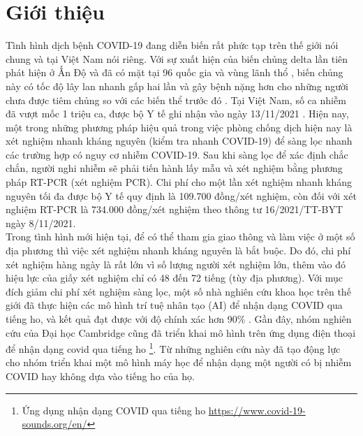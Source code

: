 \documentclass[a4paper, 12pt]{article}
\begin{document}
\fancyfoot{} %
\fancyfoot[R]{\scriptsize \ttfamily {\thepage}/\pageref{LastPage}}



\section{Giới thiệu}
\noindent
Tình hình dịch bệnh COVID-19 đang diễn biến rất phức tạp trên thế giới nói chung và tại Việt Nam nói riêng. Với sự xuất hiện của biến chủng delta lần tiên phát hiện ở Ấn Độ và đã có mặt tại 96 quốc gia và vùng lãnh thổ \cite{worldhealthorganization}, biến chủng này có tốc độ lây lan nhanh gấp hai lần và gây bệnh nặng hơn cho những người chưa được tiêm chủng so với các biến thể trước đó \cite{vietnamesecdc}. Tại Việt Nam, số ca nhiễm đã vượt mốc 1 triệu ca, được bộ Y tế ghi nhận vào ngày 13/11/2021 \cite{19}. Hiện nay, một trong những phương pháp hiệu quả trong việc phòng chống dịch hiện nay là xét nghiệm nhanh kháng nguyên (kiểm tra nhanh COVID-19) để sàng lọc nhanh các trường hợp có nguy cơ nhiễm COVID-19. Sau khi sàng lọc để xác định chắc chắn, người nghi nhiễm sẽ phải tiến hành lấy mẫu và xét nghiệm bằng phương pháp RT-PCR (xét nghiệm PCR). Chi phí cho một lần xét nghiệm nhanh kháng nguyên tối đa được bộ Y tế quy định là 109.700 đồng/xét nghiệm, còn đối với xét nghiệm RT-PCR là 734.000 đồng/xét nghiệm theo thông tư 16/2021/TT-BYT  \cite{chiphi} ngày 8/11/2021.\\
\noindent
Trong tình hình mới hiện tại, để có thể tham gia giao thông và làm việc ở một số địa phương thì việc xét nghiệm nhanh kháng nguyên là bắt buộc. Do đó, chi phí xét nghiệm hàng ngày là rất lớn vì số lượng người xét nghiệm lớn, thêm vào đó hiệu lực của giấy xét nghiệm chỉ có 48 đến 72 tiếng (tùy địa phương). Với mục đích giảm chi phí xét nghiệm sàng lọc, một số nhà nghiên cứu khoa học trên thế giới đã thực hiện các mô hình trí tuệ nhân tạo (AI) để nhận dạng COVID qua tiếng ho, và kết quả đạt được với độ chính xác hơn 90\% \cite{mitnew}. Gần đây, nhóm nghiên cứu của Đại học Cambridge cũng đã triển khai mô hình trên ứng dụng điện thoại để nhận dạng covid qua tiếng ho \footnote{ Ứng dụng nhận dạng COVID qua tiếng ho \href{https://www.covid-19-sounds.org/en/}{https://www.covid-19-sounds.org/en/}}. Từ những nghiên cứu này đã tạo động lực cho nhóm triển khai một mô hình máy học để nhận dạng một người có bị nhiễm COVID hay không dựa vào tiếng ho của họ.
\end{document}
